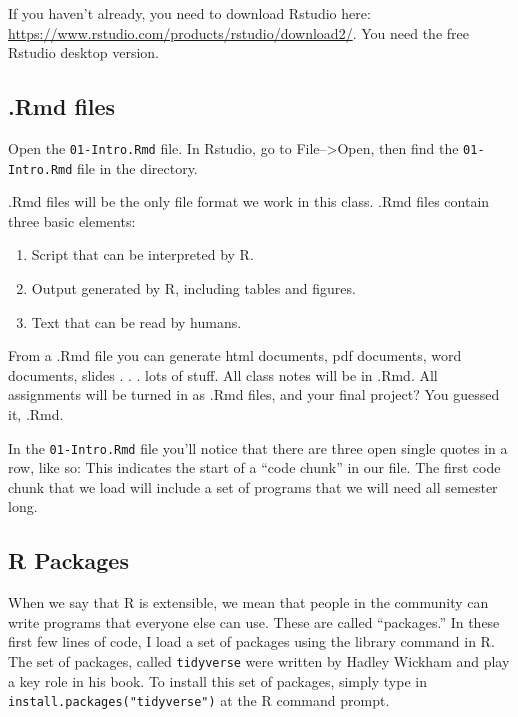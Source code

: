 \documentclass[
]{article}
\providecommand{\tightlist}{%
  \setlength{\itemsep}{0pt}\setlength{\parskip}{0pt}}
\begin{document}
If you haven't already, you need to download Rstudio here:
\url{https://www.rstudio.com/products/rstudio/download2/}. You need the
free Rstudio desktop version.

\hypertarget{rmd-files}{%
\subsection{.Rmd files}\label{rmd-files}}

Open the \texttt{01-Intro.Rmd} file. In Rstudio, go to
File--\textgreater Open, then find the \texttt{01-Intro.Rmd} file in the
directory.

.Rmd files will be the only file format we work in this class. .Rmd
files contain three basic elements:

\begin{enumerate}
\def\labelenumi{\arabic{enumi}.}
\tightlist
\item
  Script that can be interpreted by R.
\item
  Output generated by R, including tables and figures.\\
\item
  Text that can be read by humans.
\end{enumerate}

From a .Rmd file you can generate html documents, pdf documents, word
documents, slides . . . lots of stuff. All class notes will be in .Rmd.
All assignments will be turned in as .Rmd files, and your final project?
You guessed it, .Rmd.

In the \texttt{01-Intro.Rmd} file you'll notice that there are three
open single quotes in a row, like so:
\texttt{\textasciigrave{}\textasciigrave{}\textasciigrave{}} This
indicates the start of a ``code chunk'' in our file. The first code
chunk that we load will include a set of programs that we will need all
semester long.

\hypertarget{r-packages}{%
\subsection{R Packages}\label{r-packages}}

When we say that R is extensible, we mean that people in the community
can write programs that everyone else can use. These are called
``packages.'' In these first few lines of code, I load a set of packages
using the library command in R. The set of packages, called
\texttt{tidyverse} were written by Hadley Wickham and play a key role in
his book. To install this set of packages, simply type in
\texttt{install.packages("tidyverse")} at the R command prompt.
\end{document}
